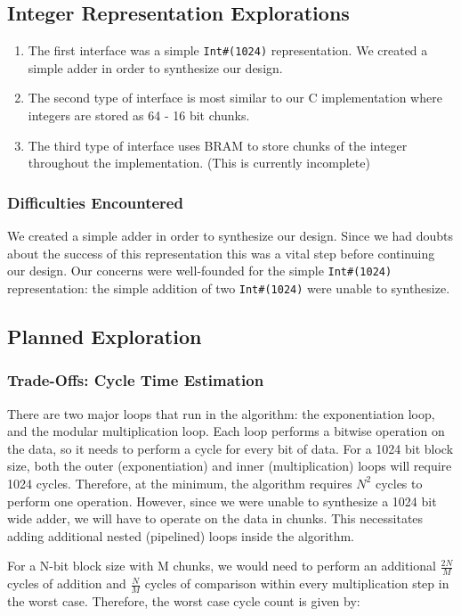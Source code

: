 \documentclass[12pt]{article}
\begin{document}
\subsection{Integer Representation Explorations}
\begin{enumerate}
\item The first interface was a simple {\tt Int\#(1024)} representation. We created a simple adder in order to synthesize our design.
\item The second type of interface is most similar to our C implementation where integers are stored as 64 - 16 bit chunks.
\item The third type of interface uses BRAM to store chunks of the integer throughout the implementation. (This is currently incomplete)
\end{enumerate}
\subsubsection{Difficulties Encountered}
We created a simple adder in order to synthesize our design.  Since we had doubts about the success of this representation this was a vital step before continuing our design. Our concerns were well-founded for the simple {\tt Int\#(1024)} representation: the simple addition of two {\tt Int\#(1024)} were unable to synthesize.
\subsection{Planned Exploration}

\subsubsection{Trade-Offs: Cycle Time Estimation}

There are two major loops that run in the algorithm: the exponentiation loop,
and the modular multiplication loop. Each loop performs a bitwise operation
on the data, so it needs to perform a cycle for every bit of data. For a
1024 bit block size, both the outer (exponentiation) and inner (multiplication)
loops will require 1024 cycles. Therefore, at the minimum, the algorithm
requires ${N}^2$ cycles to perform one operation. However, since we were unable
to synthesize a 1024 bit wide adder, we will have to operate on the data
in chunks. This necessitates adding additional nested (pipelined) loops
inside the algorithm.

For a N-bit block size with M chunks, we would need to perform an additional $\frac{2N}{M}$
cycles of addition and $\frac{N}{M}$ cycles of comparison within every multiplication step in
the worst case. Therefore, the worst case cycle count is given by:
\end{document}
